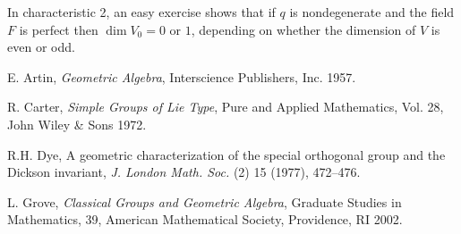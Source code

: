 \documentclass[12pt,oneside]{amsart}
\theoremstyle{definition}
\theoremstyle{remark}
\begin{document}
In characteristic 2, an easy exercise \cite[p.~114]{Grove} shows that
if $q$ is nondegenerate and the field $F$ is perfect then $\dim V_0 =
0$ or $1$, depending on whether the dimension of $V$ is even or odd.





\begin{thebibliography}{99}\frenchspacing\raggedright\scriptsize
{} E. Artin, \emph{Geometric Algebra},
  Interscience Publishers, Inc. 1957.

 R. Carter, \emph{Simple Groups of Lie
    Type}, Pure and Applied Mathematics, Vol. 28, John Wiley \& Sons
  1972.

 R.H. Dye, A geometric characterization of the
  special orthogonal group and the Dickson invariant, \emph{J. London
    Math. Soc.} (2) 15 (1977), 472--476.

 L. Grove, \emph{Classical Groups and
    Geometric Algebra}, Graduate Studies in Mathematics, 39, American
  Mathematical Society, Providence, RI 2002.
\end{thebibliography}
\end{document}
